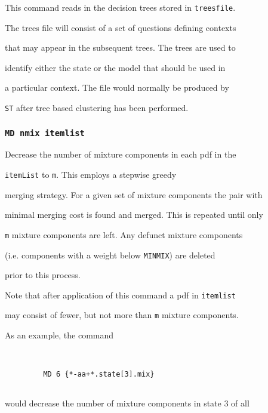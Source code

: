 This command reads in the decision trees stored in \texttt{treesfile}.


The trees file will consist of a set of questions defining contexts


that may appear in the subsequent trees.  The trees are used to


identify either the state or the model that should be used in


a particular context.  The file would normally be produced by


\texttt{ST} after tree based clustering has been performed.





\subsubsection*{\tt MD nmix itemlist}





Decrease the number of mixture components in each pdf in the


\texttt{itemList} to \texttt{m}. This employs a stepwise greedy


merging strategy. For a given set of mixture components the pair with


minimal merging cost is found and merged. This is repeated until only


\texttt{m} mixture components are left. Any defunct mixture components


(i.e. components with a weight below \texttt{MINMIX}) are deleted


prior to this process.





Note that after application of this command a pdf in {\tt itemlist}


may consist of fewer, but not more than \texttt{m} mixture components.





As an example, the command


\begin{verbatim}


         MD 6 {*-aa+*.state[3].mix}


\end{verbatim}


would decrease the number of mixture components in state 3 of all


